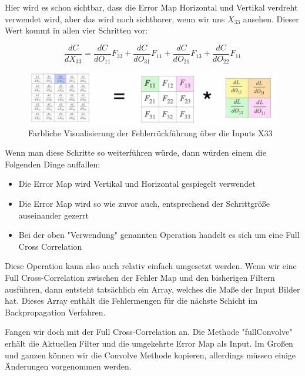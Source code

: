 \documentclass[12pt]{article}
\begin{document}
Hier wird es schon sichtbar, dass die Error Map Horizontal und Vertikal verdreht verwendet wird, aber das wird noch sichtbarer, wenn wir uns $X_{33}$ ansehen. Dieser Wert kommt in allen vier Schritten vor:

$$\frac {dC} {dX_{33}} = \frac {dC}{dO_{11}} F_{33} + \frac {dC}{dO_{31}} F_{11} + \frac {dC}{dO_{21}} F_{13} + \frac {dC}{dO_{22}} F_{11}$$

\begin{figure}[H]
\centering
\includegraphics[scale=0.80]{Images/TemporaryPlaceholders/Farbliche Visualisierung der Fehlerrückführung über die Inputs X31.png}
\caption{Farbliche Visualisierung der Fehlerrückführung über die Inputs X33}
\label{Farbliche Visualisierung der Fehlerrückführung über die Inputs X33}
\end{figure}

Wenn man diese Schritte so weiterführen würde, dann würden einem die Folgenden Dinge auffallen:
\begin{itemize}
  \item Die Error Map wird Vertikal und Horizontal gespiegelt verwendet
  \item Die Error Map wird so wie zuvor auch, entsprechend der Schrittgröße auseinander gezerrt  
  \item Bei der oben "Verwendung" genannten Operation handelt es sich um eine Full Cross Correlation
\end{itemize}

Diese Operation kann also auch relativ einfach umgesetzt werden. Wenn wir eine Full Cross-Correlation zwischen der Fehler Map und den bisherigen Filtern ausführen, dann entsteht tatsächlich ein Array, welches die Maße der Input Bilder hat. Dieses Array enthält die Fehlermengen für die nächste Schicht im Backpropagation Verfahren. 

Fangen wir doch mit der Full Cross-Correlation an. Die Methode "fullConvolve" erhält die Aktuellen Filter und die umgekehrte Error Map als Input. Im Großen und ganzen können wir die Convolve Methode kopieren, allerdings müssen einige Änderungen vorgenommen werden.
\end{document}
